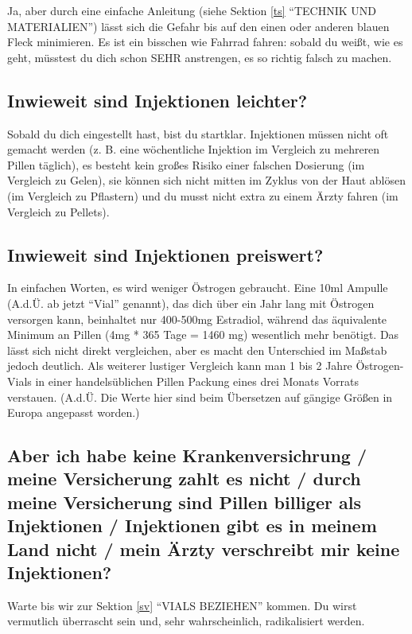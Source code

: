 \documentclass{article}
\begin{document}
Ja, aber durch eine einfache Anleitung (siehe Sektion \ref{ts} “TECHNIK UND MATERIALIEN”) lässt sich die Gefahr bis auf den einen oder anderen blauen Fleck minimieren. Es ist ein bisschen wie Fahrrad fahren: sobald du weißt, wie es geht, müsstest du dich schon SEHR anstrengen, es so richtig falsch zu machen.

\subsection{Inwieweit sind Injektionen leichter?}

Sobald du dich eingestellt hast, bist du startklar. Injektionen müssen nicht oft gemacht werden (z. B. eine wöchentliche Injektion im Vergleich zu mehreren Pillen täglich), es besteht kein großes Risiko einer falschen Dosierung (im Vergleich zu Gelen), sie können sich nicht mitten im Zyklus von der Haut ablösen (im Vergleich zu Pflastern) und du musst nicht extra zu einem Ärzty fahren (im Vergleich zu Pellets).

\subsection{Inwieweit sind Injektionen preiswert?}

In einfachen Worten, es wird weniger Östrogen gebraucht. Eine 10ml Ampulle (A.d.Ü. ab jetzt “Vial” genannt), das dich über ein Jahr lang mit Östrogen versorgen kann, beinhaltet nur 400-500mg Estradiol, während das äquivalente Minimum an Pillen (4mg * 365 Tage = 1460 mg) wesentlich mehr benötigt. Das lässt sich nicht direkt vergleichen, aber es macht den Unterschied im Maßstab jedoch deutlich. Als weiterer lustiger Vergleich kann man 1 bis 2 Jahre Östrogen-Vials in einer handelsüblichen Pillen Packung eines drei Monats Vorrats verstauen. (A.d.Ü. Die Werte hier sind beim Übersetzen auf gängige Größen in Europa angepasst worden.)

\subsection{Aber ich habe keine Krankenversichrung / meine Versicherung zahlt es nicht / durch meine Versicherung sind Pillen billiger als Injektionen / Injektionen gibt es in meinem Land nicht / mein Ärzty verschreibt mir keine Injektionen?}

Warte bis wir zur Sektion \ref{sv} “VIALS BEZIEHEN” kommen. Du wirst vermutlich überrascht sein und, sehr wahrscheinlich, radikalisiert werden.
\end{document}
